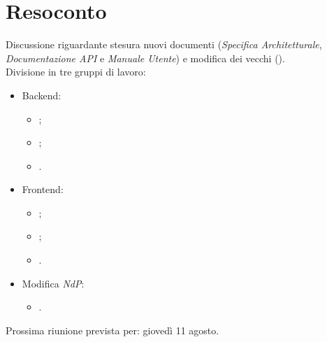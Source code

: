 \documentclass{classes/base}
\begin{document}
    \section*{Resoconto}
    Discussione riguardante stesura nuovi documenti (\textit{Specifica Architetturale}, \textit{Documentazione API} e
    \textit{Manuale Utente}) e modifica dei vecchi (\NdP).\\
    Divisione in tre gruppi di lavoro: 
    \begin{itemize}
    	\item Backend: 
        \begin{itemize}
            \item \marcov;
            \item \marcob;
            \item \matteo.
        \end{itemize}
        \item Frontend:
        \begin{itemize}
            \item \tommaso;
            \item \angela;
            \item \giulio.
        \end{itemize}
        \item Modifica \textit{NdP}: 
        \begin{itemize}
            \item \ruth.
        \end{itemize}
    \end{itemize}

    Prossima riunione prevista per: giovedì 11 agosto.

    
\end{document}
